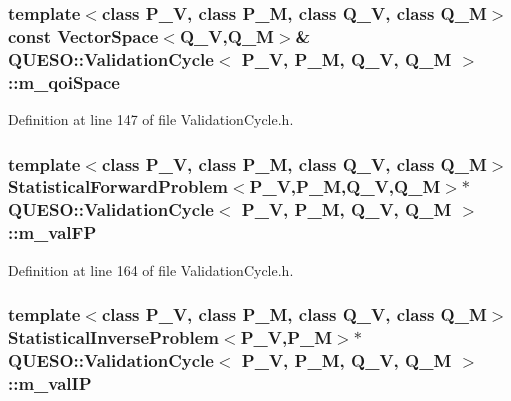 \hypertarget{class_q_u_e_s_o_1_1_validation_cycle_adccd6175c04258a6f603a92a7ae4327c}{
\subsubsection[{m\-\_\-qoi\-Space}]{\setlength{\rightskip}{0pt plus 5cm}template$<$class P\-\_\-\-V, class P\-\_\-\-M, class Q\-\_\-\-V, class Q\-\_\-\-M$>$ const {\bf Vector\-Space}$<$Q\-\_\-\-V,Q\-\_\-\-M$>$\& {\bf Q\-U\-E\-S\-O\-::\-Validation\-Cycle}$<$ P\-\_\-\-V, P\-\_\-\-M, Q\-\_\-\-V, Q\-\_\-\-M $>$\-::m\-\_\-qoi\-Space\hspace{0.3cm}{\ttfamily [private]}}}\label{class_q_u_e_s_o_1_1_validation_cycle_adccd6175c04258a6f603a92a7ae4327c}


Definition at line 147 of file Validation\-Cycle.\-h.

\hypertarget{class_q_u_e_s_o_1_1_validation_cycle_ac1ba4bc21405b92f9bce23e8579e5c70}{
\subsubsection[{m\-\_\-val\-F\-P}]{\setlength{\rightskip}{0pt plus 5cm}template$<$class P\-\_\-\-V, class P\-\_\-\-M, class Q\-\_\-\-V, class Q\-\_\-\-M$>$ {\bf Statistical\-Forward\-Problem}$<$P\-\_\-\-V,P\-\_\-\-M,Q\-\_\-\-V,Q\-\_\-\-M$>$$\ast$ {\bf Q\-U\-E\-S\-O\-::\-Validation\-Cycle}$<$ P\-\_\-\-V, P\-\_\-\-M, Q\-\_\-\-V, Q\-\_\-\-M $>$\-::m\-\_\-val\-F\-P\hspace{0.3cm}{\ttfamily [private]}}}\label{class_q_u_e_s_o_1_1_validation_cycle_ac1ba4bc21405b92f9bce23e8579e5c70}


Definition at line 164 of file Validation\-Cycle.\-h.

\hypertarget{class_q_u_e_s_o_1_1_validation_cycle_ad65609930305ca35305bb7b42b1acfad}{
\subsubsection[{m\-\_\-val\-I\-P}]{\setlength{\rightskip}{0pt plus 5cm}template$<$class P\-\_\-\-V, class P\-\_\-\-M, class Q\-\_\-\-V, class Q\-\_\-\-M$>$ {\bf Statistical\-Inverse\-Problem}$<$P\-\_\-\-V,P\-\_\-\-M$>$$\ast$ {\bf Q\-U\-E\-S\-O\-::\-Validation\-Cycle}$<$ P\-\_\-\-V, P\-\_\-\-M, Q\-\_\-\-V, Q\-\_\-\-M $>$\-::m\-\_\-val\-I\-P\hspace{0.3cm}{\ttfamily [private]}}}\label{class_q_u_e_s_o_1_1_validation_cycle_ad65609930305ca35305bb7b42b1acfad}


